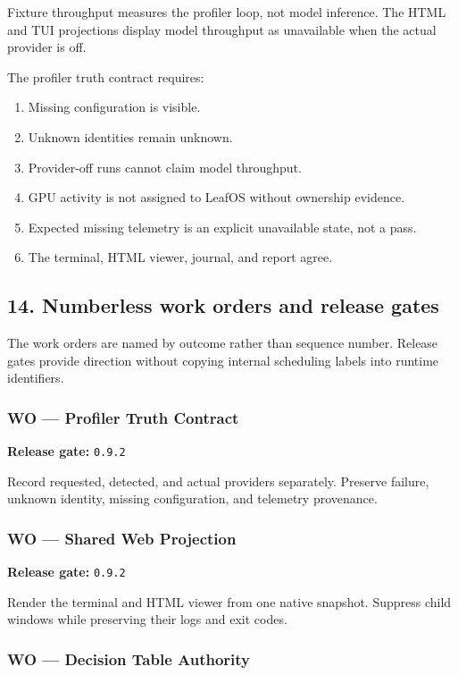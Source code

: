 Fixture throughput measures the profiler loop, not model inference. The HTML
and TUI projections display model throughput as unavailable when the actual
provider is off.

The profiler truth contract requires:

\begin{enumerate}
\def\labelenumi{\arabic{enumi}.}
\item
  Missing configuration is visible.
\item
  Unknown identities remain unknown.
\item
  Provider-off runs cannot claim model throughput.
\item
  GPU activity is not assigned to LeafOS without ownership evidence.
\item
  Expected missing telemetry is an explicit unavailable state, not a pass.
\item
  The terminal, HTML viewer, journal, and report agree.
\end{enumerate}

\subsection{14. Numberless work orders and release gates}

The work orders are named by outcome rather than sequence number. Release gates
provide direction without copying internal scheduling labels into runtime
identifiers.

\subsubsection{WO --- Profiler Truth Contract}

\textbf{Release gate:} \texttt{0.9.2}

Record requested, detected, and actual providers separately. Preserve failure,
unknown identity, missing configuration, and telemetry provenance.

\subsubsection{WO --- Shared Web Projection}

\textbf{Release gate:} \texttt{0.9.2}

Render the terminal and HTML viewer from one native snapshot. Suppress child
windows while preserving their logs and exit codes.

\subsubsection{WO --- Decision Table Authority}

